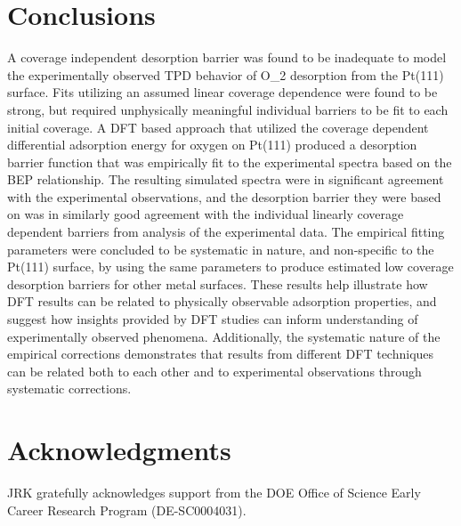 \documentclass{svjour3}
\begin{document}
\section{Conclusions}
\label{sec:orgc238097}
A coverage independent desorption barrier was found to be inadequate to model the experimentally observed TPD behavior of O\_2 desorption from the Pt(111) surface.  Fits utilizing an assumed linear coverage dependence were found to be strong, but required unphysically meaningful individual barriers to be fit to each initial coverage.  A DFT based approach that utilized the coverage dependent differential adsorption energy for oxygen on Pt(111) produced a desorption barrier function that was empirically fit to the experimental spectra based on the BEP relationship.  The resulting simulated spectra were in significant agreement with the experimental observations, and the desorption barrier they were based on was in similarly good agreement with the individual linearly coverage dependent barriers from analysis of the experimental data.  The empirical fitting parameters were concluded to be systematic in nature, and non-specific to the Pt(111) surface, by using the same parameters to produce estimated low coverage desorption barriers for other metal surfaces.  These results help illustrate how DFT results can be related to physically observable adsorption properties, and suggest how insights provided by DFT studies can inform understanding of experimentally observed phenomena.  Additionally, the systematic nature of the empirical corrections demonstrates that results from different DFT techniques can be related both to each other and to experimental observations through systematic corrections.

\section{Acknowledgments}
\label{sec:org3b8de96}
JRK gratefully acknowledges support from the DOE Office of Science Early Career Research Program (DE-SC0004031).





\end{document}
